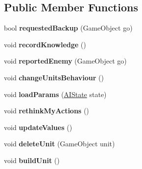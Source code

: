 \subsection*{Public Member Functions}
\begin{DoxyCompactItemize}
\item 
\hypertarget{class_a_i_controller_a2def6727dc18d551ed80734d40853ae0}{}bool {\bfseries requested\+Backup} (Game\+Object go)\label{class_a_i_controller_a2def6727dc18d551ed80734d40853ae0}

\item 
\hypertarget{class_a_i_controller_a8124de03eacb145d9187a1c6139417da}{}void {\bfseries record\+Knowledge} ()\label{class_a_i_controller_a8124de03eacb145d9187a1c6139417da}

\item 
\hypertarget{class_a_i_controller_ab91b933e115fe715a2a32ea00336c05f}{}void {\bfseries reported\+Enemy} (Game\+Object go)\label{class_a_i_controller_ab91b933e115fe715a2a32ea00336c05f}

\item 
\hypertarget{class_a_i_controller_a90cd1325dbe011127063e5e099372165}{}void {\bfseries change\+Units\+Behaviour} ()\label{class_a_i_controller_a90cd1325dbe011127063e5e099372165}

\item 
\hypertarget{class_a_i_controller_a637c90cb0057aab98431c62b8257e9f4}{}void {\bfseries load\+Params} (\hyperlink{class_a_i_controller_1_1_a_i_state}{A\+I\+State} state)\label{class_a_i_controller_a637c90cb0057aab98431c62b8257e9f4}

\item 
\hypertarget{class_a_i_controller_ac868ca1d10ccf1455a13f88b5f849401}{}void {\bfseries rethink\+My\+Actions} ()\label{class_a_i_controller_ac868ca1d10ccf1455a13f88b5f849401}

\item 
\hypertarget{class_a_i_controller_a051753509a5e22829dadf3bb08eccd48}{}void {\bfseries update\+Values} ()\label{class_a_i_controller_a051753509a5e22829dadf3bb08eccd48}

\item 
\hypertarget{class_a_i_controller_a348e9c5bd9e3ef59523577058524b034}{}void {\bfseries delete\+Unit} (Game\+Object unit)\label{class_a_i_controller_a348e9c5bd9e3ef59523577058524b034}

\item 
\hypertarget{class_a_i_controller_aa7f409a237a65ef7757e60947e3ad8b9}{}void {\bfseries build\+Unit} ()\label{class_a_i_controller_aa7f409a237a65ef7757e60947e3ad8b9}

\end{DoxyCompactItemize}
